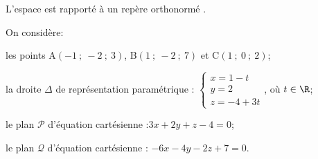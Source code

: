 \medskip






L'espace est rapporté à un repère orthonormé \Oijk.

\medskip

\begin{list}{\textbullet}{On considère:}
\item les points A$(-1~;~-2~;~3)$, B$(1~;~-2~;~7)$ et C$(1~;~0~;~2)$;
\item la droite $\Delta$ de représentation paramétrique : \quad $\left\{\begin{array}{l}x=1-t \\ y=2 \\ z=-4+3 t\end{array}\right.$, où $t \in \R$;
\item le plan $\mathcal{P}$ d'équation cartésienne :\quad $3 x+2 y+z-4=0$;
\item le plan $\mathcal{Q}$ d'équation cartésienne : \quad $-6 x-4 y-2 z+7=0$.
\end{list}

